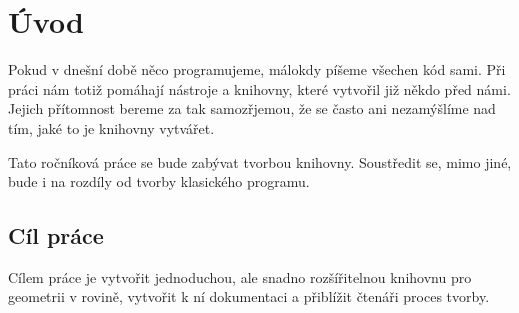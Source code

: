 \chapter{Úvod}
\label{chap:introduction}

Pokud v dnešní době něco programujeme, málokdy píšeme všechen kód sami. 
Při práci nám totiž pomáhají nástroje a knihovny, které vytvořil již někdo před námi.
Jejich přítomnost bereme za tak samozřjemou, že se často ani nezamýšlíme nad tím, jaké to je knihovny vytvářet.  

Tato ročníková práce se bude zabývat tvorbou knihovny. Soustředit se, mimo jiné, bude i na rozdíly od tvorby klasického programu.

\section{Cíl práce}
\label{sec:goal}

Cílem práce je vytvořit jednoduchou, ale snadno rozšířitelnou knihovnu pro geometrii v rovině, vytvořit k ní dokumentaci a přiblížit čtenáři proces tvorby. 